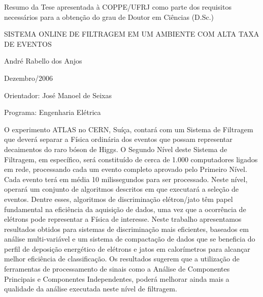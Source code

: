 \newenvironment{summary}[1]{%
\begin{minipage}{\linewidth}%
\newcommand{\saveparameter}{\baselinestretch}%
\renewcommand{\baselinestretch}{#1}%
\normalsize}%
{%
\renewcommand{\baselinestretch}{\saveparameter}%
\end{minipage}%
}


\noindent
Resumo da Tese apresentada à COPPE/UFRJ como parte dos requisitos necessários
para a obtenção do grau de Doutor em Ciências (D.Sc.)

\vspace{1.5cm}

\begin{center}
SISTEMA ONLINE DE FILTRAGEM EM UM AMBIENTE COM ALTA TAXA DE EVENTOS
\vspace{1cm}

André Rabello dos Anjos
\vspace{1cm}

Dezembro/2006
\end{center}
\vspace{1.5cm}

\noindent
Orientador: José Manoel de Seixas
\vspace{1.5cm}

\noindent
Programa: Engenharia Elétrica
\vspace{2cm}

\begin{summary}{1.2}
\hspace{0.8cm}O experimento ATLAS no CERN, Suíça, contará com um Sistema de
Filtragem que deverá separar a Física ordinária dos eventos que possam
representar decaimentos do raro bóson de Higgs. O Segundo Nível deste Sistema
de Filtragem, em específico, será constituído de cerca de 1.000 computadores
ligados em rede, processando cada um evento completo aprovado pelo Primeiro
Nível. Cada evento terá em média 10 milissegundos para ser processado.  Neste
nível, operará um conjunto de algoritmos descritos em  que
executará a seleção de eventos. Dentre esses, algoritmos de discriminação
elétron/jato têm papel fundamental na eficiência da aquisição de dados, uma
vez que a ocorrência de elétrons pode representar a Física de interesse. Neste
trabalho apresentamos resultados obtidos para sistemas de discriminação mais
eficientes, baseados em análise multi-variável e um sistema de compactação
de dados que se beneficia do perfil de deposição energético de elétrons e
jatos em calorímetros para alcançar melhor eficiência de classificação. Os
resultados sugerem que a utilização de ferramentas de processamento de sinais
como a Análise de Componentes Principais e Componentes Independentes, poderá
melhorar ainda mais a qualidade da análise executada neste nível de filtragem.
\end{summary}

